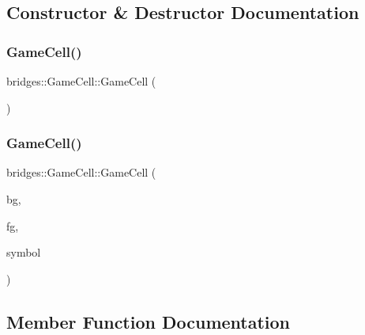 \subsection{Constructor \& Destructor Documentation}
\mbox{\label{classbridges_1_1_game_cell_ad498aad8d6cb4d3e956f19071a8ae201}} 
\subsubsection{\texorpdfstring{Game\+Cell()}{GameCell()}\hspace{0.1cm}{\footnotesize\ttfamily [1/2]}}
{\footnotesize\ttfamily bridges\+::\+Game\+Cell\+::\+Game\+Cell (\begin{DoxyParamCaption}{ }\end{DoxyParamCaption})\hspace{0.3cm}{\ttfamily [inline]}}

\mbox{\label{classbridges_1_1_game_cell_a5c6b1800cd495ef394112eecaf76eb16}} 
\subsubsection{\texorpdfstring{Game\+Cell()}{GameCell()}\hspace{0.1cm}{\footnotesize\ttfamily [2/2]}}
{\footnotesize\ttfamily bridges\+::\+Game\+Cell\+::\+Game\+Cell (\begin{DoxyParamCaption}\item[{\hyperlink{namespacebridges_ad811207d8898a7fd6b72a74725e68357}{Named\+Color}}]{bg,  }\item[{\hyperlink{namespacebridges_ad811207d8898a7fd6b72a74725e68357}{Named\+Color}}]{fg,  }\item[{\hyperlink{namespacebridges_acfb0a4f7877d8f63de3e6862004c50ed}{Named\+Symbol}}]{symbol }\end{DoxyParamCaption})\hspace{0.3cm}{\ttfamily [inline]}}



\subsection{Member Function Documentation}
\mbox{\label{classbridges_1_1_game_cell_a781afb078bedaba909f124eddd543056}} 
